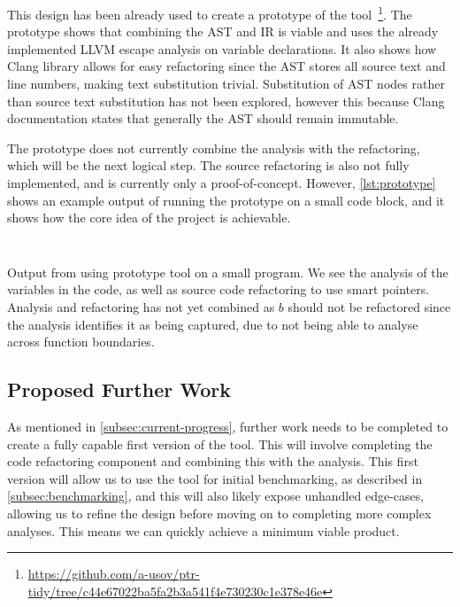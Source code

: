 \documentclass{proposal}
\begin{document}
    This design has been already used to create a prototype of the tool~\footnote{\url{https://github.com/a-usov/ptr-tidy/tree/c44e67022ba5fa2b3a541f4e730230c1e378e46e}}.
    The prototype shows that combining the AST and IR is viable and uses the already implemented LLVM escape analysis on variable declarations.
    It also shows how Clang library allows for easy refactoring since the AST stores all source text and line numbers, making text substitution trivial.
    Substitution of AST nodes rather than source text substitution has not been explored, however this because Clang documentation states that generally the AST should remain immutable.

    The prototype does not currently combine the analysis with the refactoring, which will be the next logical step.
    The source refactoring is also not fully implemented, and is currently only a proof-of-concept.
    However, \autoref{lst:prototype} shows an example output of running the prototype on a small code block, and it shows how the core idea of the project is achievable.

    \begin{listing}
        \inputminted{c++}{code/prototype-input.cpp}
        \inputminted{text}{code/prototype-output.txt}
        \caption{Output from using prototype tool on a small program. We see the analysis of the variables in the code, as well as source code refactoring to use smart pointers. Analysis and refactoring has not yet combined as $b$ should not be refactored since the analysis identifies it as being captured, due to not being able to analyse across function boundaries.}
        \label{lst:prototype}
    \end{listing}

    \subsection{Proposed Further Work}\label{subsec:proposed-further-work}

    As mentioned in \autoref{subsec:current-progress}, further work needs to be completed to create a fully capable first version of the tool.
    This will involve completing the code refactoring component and combining this with the analysis.
    This first version will allow us to use the tool for initial benchmarking, as described in \autoref{subsec:benchmarking}, and this will also likely expose unhandled edge-cases, allowing us to refine the design before moving on to completing more complex analyses.
    This means we can quickly achieve a minimum viable product.
\end{document}
